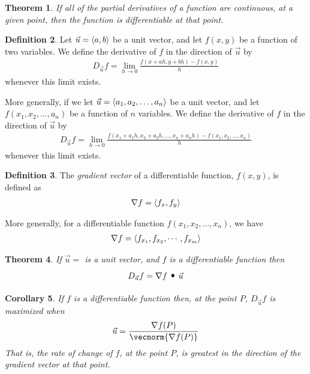 \documentclass{article}[11pt]
\newtheorem{theorem}{Theorem}[section]
\newtheorem{corollary}[theorem]{Corollary}
\theoremstyle{definition}
\newtheorem{definition}[theorem]{Definition}
\DeclareMathOperator*{\dotprod}{\scalerel*{\cdot}{\bigodot}}
\DeclarePairedDelimiter\vecvec{\langle}{\rangle}
\numberwithin{equation}{section}
\begin{document}
\begin{theorem}
	If all of the partial derivatives of a function are continuous, at a given point, then the function is differentiable at that point.
\end{theorem}

\begin{definition}
	Let \(\vec{u}=\vecvec{a,b}\) be a unit vector, and let \(f(x,y)\) be a function of two variables. We define the derivative of \(f\) in the direction of \(\vec{u}\) by
	\begin{align}
	D_{\vec{u}}f=\lim_{h \to 0} \frac{f(x+ah,y+bh)-f(x,y)}{h}
	\end{align}
	whenever this limit exists.
	
	More generally, if we let \(\vec{u}=\vecvec{a_1,a_2,\dots,a_n}\) be a unit vector, and let \(f(x_1,x_2,\dots,a_n)\) be a function of \(n\) variables. We define the derivative of \(f\) in the direction of \(\vec{u}\) by
	\begin{align*}
	D_{\vec{u}}f=\lim_{h \to 0} \frac{f(x_1+a_1 h,x_2+a_2 h,\dots,x_n+a_n h)-f(x_1,x_2,\dots,x_n)}{h}
	\end{align*}
	whenever this limit exists.
\end{definition}
\begin{definition}
	The \emph{gradient vector} of a differentiable function, \(f(x,y)\), is defined as 
	\begin{align}
	\nabla f = \vecvec{f_x,f_y}
	\end{align}
	
	More generally, for a differentiable function \(f(x_1,x_2,\dots,x_n)\), we have
	\begin{align*}
	\nabla f = \vecvec{f_{x_1},f_{x_2},\cdots,f_{x_m}}
	\end{align*}
\end{definition}
\begin{theorem}
	If \(\vec{u}=\) is a unit vector, and \(f\) is a differentiable function then
	\begin{align}
	D_{\vec{u}}f=\nabla f\dotprod \vec{u}
	\end{align}
\end{theorem}
\begin{corollary}
	If \(f\) is a differentiable function then, at the point \(P\), \(D_{\vec{u}}f\) is maximized when 
	\begin{align}
	\vec{u}=\frac{\nabla f(P)}{\vecnorm{\nabla f(P)}}
	\end{align}
	That is, the rate of change of \(f\), at the point \(P\), is greatest in the direction of the gradient vector at that point.
\end{corollary}
\end{document}
